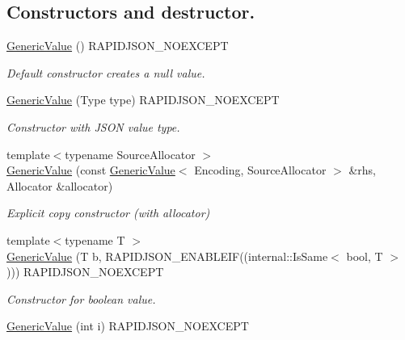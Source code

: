 \subsection*{Constructors and destructor.}
\begin{DoxyCompactItemize}
\item 
\hyperlink{class_generic_value_ab0205d57176d83814ea4e4598c596fe8}{Generic\+Value} () R\+A\+P\+I\+D\+J\+S\+O\+N\+\_\+\+N\+O\+E\+X\+C\+E\+PT\hypertarget{class_generic_value_ab0205d57176d83814ea4e4598c596fe8}{}\label{class_generic_value_ab0205d57176d83814ea4e4598c596fe8}

\begin{DoxyCompactList}\small\item\em Default constructor creates a null value. \end{DoxyCompactList}\item 
\hyperlink{class_generic_value_a83c8f84b8e61f2f40414b703b75aea61}{Generic\+Value} (Type type) R\+A\+P\+I\+D\+J\+S\+O\+N\+\_\+\+N\+O\+E\+X\+C\+E\+PT
\begin{DoxyCompactList}\small\item\em Constructor with J\+S\+ON value type. \end{DoxyCompactList}\item 
{\footnotesize template$<$typename Source\+Allocator $>$ }\\\hyperlink{class_generic_value_a5161c0c98ba9144c50a38acde28a5ede}{Generic\+Value} (const \hyperlink{class_generic_value}{Generic\+Value}$<$ Encoding, Source\+Allocator $>$ \&rhs, Allocator \&allocator)
\begin{DoxyCompactList}\small\item\em Explicit copy constructor (with allocator) \end{DoxyCompactList}\item 
{\footnotesize template$<$typename T $>$ }\\\hyperlink{class_generic_value_a0f6a0394bfffaedde88e433b2265194c}{Generic\+Value} (T b, R\+A\+P\+I\+D\+J\+S\+O\+N\+\_\+\+E\+N\+A\+B\+L\+E\+IF((internal\+::\+Is\+Same$<$ bool, T $>$))) R\+A\+P\+I\+D\+J\+S\+O\+N\+\_\+\+N\+O\+E\+X\+C\+E\+PT
\begin{DoxyCompactList}\small\item\em Constructor for boolean value. \end{DoxyCompactList}\item 
\hyperlink{class_generic_value_aafc754ade38421c179f5c8933ecbaf45}{Generic\+Value} (int i) R\+A\+P\+I\+D\+J\+S\+O\+N\+\_\+\+N\+O\+E\+X\+C\+E\+PT\hypertarget{class_generic_value_aafc754ade38421c179f5c8933ecbaf45}{}\label{class_generic_value_aafc754ade38421c179f5c8933ecbaf45}


\end{DoxyCompactItemize}
